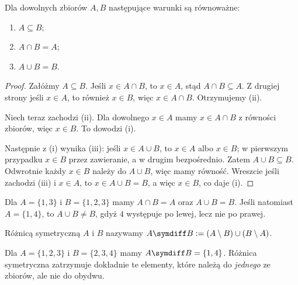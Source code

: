 \begin{twierdzenie}\label{thm:subset-test}
Dla dowolnych zbiorów $A,B$ następujące warunki są równoważne:
\begin{enumerate}[label=(\roman*)]
\item $A\subseteq B$;
\item $A\cap B=A$;
\item $A\cup B=B$.
\end{enumerate}
\end{twierdzenie}
\begin{proof}
Załóżmy $A\subseteq B$. Jeśli $x\in A\cap B$, to
$x\in A$, stąd $A\cap B\subseteq A$. Z drugiej strony
jeśli $x\in A$, to również $x\in B$, więc
$x\in A\cap B$. Otrzymujemy (ii).

Niech teraz zachodzi (ii). Dla dowolnego $x\in A$ mamy
$x\in A\cap B$ z równości zbiorów, więc $x\in B$.
To dowodzi (i).

Następnie z (i) wynika (iii): jeśli $x\in A\cup B$,
to $x\in A$ albo $x\in B$; w pierwszym przypadku
$x\in B$ przez zawieranie, a w drugim bezpośrednio.
Zatem $A\cup B\subseteq B$. Odwrotnie każdy $x\in B$
należy do $A\cup B$, więc mamy równość.
Wreszcie jeśli zachodzi (iii) i $x\in A$, to
$x\in A\cup B=B$, a więc $x\in B$, co daje (i).
\end{proof}

\begin{przyklad}
Dla $A=\{1,3\}$ i $B=\{1,2,3\}$ mamy
$A\cap B=A$ oraz $A\cup B=B$. Jeśli natomiast
$A=\{1,4\}$, to $A\cup B\ne B$, gdyż $4$ występuje
po lewej, lecz nie po prawej.
\end{przyklad}

\begin{definicja}
Różnicą symetryczną $A$ i $B$ nazywamy
$A\symdiff B:=(A\setminus B)\cup(B\setminus A)$.
\end{definicja}
\begin{przyklad}
Dla $A=\{1,2,3\}$ i $B=\{2,3,4\}$ mamy
$A\symdiff B=\{1,4\}$. Różnica symetryczna zatrzymuje
dokładnie te elementy, które należą do \emph{jednego} ze zbiorów,
ale nie do obydwu.
\end{przyklad}


